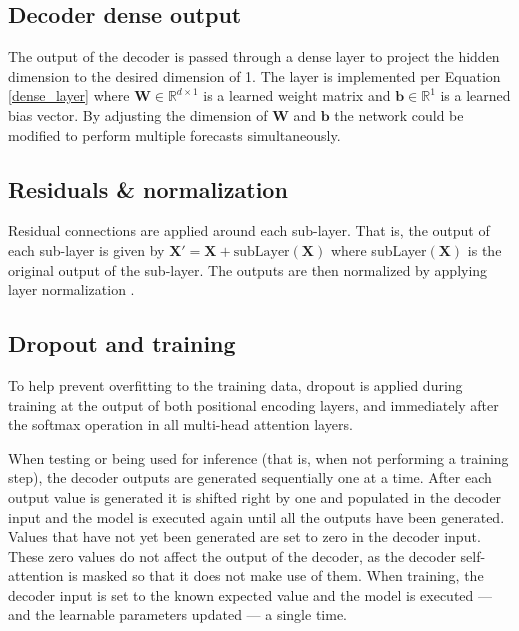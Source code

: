 \subsection{Decoder dense output}
The output of the decoder is passed through a dense layer to project the hidden dimension to the desired dimension of 1.
The layer is implemented per Equation \ref{dense_layer} where $\boldsymbol{W} \in \mathbb{R}^{d \times 1}$ is a learned weight matrix and $\boldsymbol{b} \in \mathbb{R}^{1}$ is a learned bias vector.
By adjusting the dimension of $\boldsymbol{W}$ and $\boldsymbol{b}$ the network could be modified to perform multiple forecasts simultaneously.


\subsection{Residuals \& normalization}
Residual connections \cite{He2015} are applied around each sub-layer.
That is, the output of each sub-layer is given by $\boldsymbol{X'} = \boldsymbol{X} + \text{subLayer}(\boldsymbol{X})$ where subLayer$(\boldsymbol{X})$ is the original output of the sub-layer.
The outputs are then normalized by applying layer normalization \cite{Ba2016}.

\subsection{Dropout and training}
\label{transformer-dropout-training}
To help prevent overfitting to the training data, dropout \cite{srivastava14a} is applied during training at the output of both positional encoding layers, and immediately after the softmax operation in all multi-head attention layers.

When testing or being used for inference (that is, when not performing a training step), the decoder outputs are generated sequentially one at a time.
After each output value is generated it is shifted right by one and populated in the decoder input and the model is executed again until all the outputs have been generated.
Values that have not yet been generated are set to zero in the decoder input.
These zero values do not affect the output of the decoder, as the decoder self-attention is masked so that it does not make use of them.
When training, the decoder input is set to the known expected value and the model is executed --- and the learnable parameters updated --- a single time.

